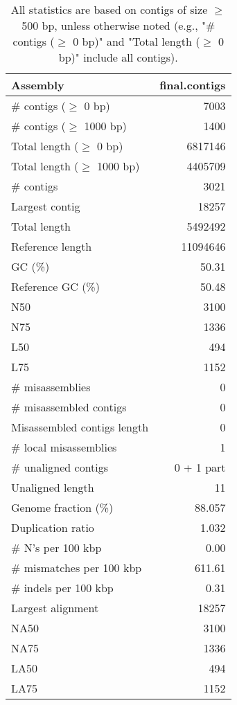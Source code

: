 \documentclass[12pt,a4paper]{article}
\begin{document}
\begin{table}[ht]
\begin{center}
\caption{All statistics are based on contigs of size $\geq$ 500 bp, unless otherwise noted (e.g., "\# contigs ($\geq$ 0 bp)" and "Total length ($\geq$ 0 bp)" include all contigs).}
\begin{tabular}{|l*{1}{|r}|}
\hline
Assembly & final.contigs \\ \hline
\# contigs ($\geq$ 0 bp) & 7003 \\ \hline
\# contigs ($\geq$ 1000 bp) & 1400 \\ \hline
Total length ($\geq$ 0 bp) & 6817146 \\ \hline
Total length ($\geq$ 1000 bp) & 4405709 \\ \hline
\# contigs & 3021 \\ \hline
Largest contig & 18257 \\ \hline
Total length & 5492492 \\ \hline
Reference length & 11094646 \\ \hline
GC (\%) & 50.31 \\ \hline
Reference GC (\%) & 50.48 \\ \hline
N50 & 3100 \\ \hline
N75 & 1336 \\ \hline
L50 & 494 \\ \hline
L75 & 1152 \\ \hline
\# misassemblies & 0 \\ \hline
\# misassembled contigs & 0 \\ \hline
Misassembled contigs length & 0 \\ \hline
\# local misassemblies & 1 \\ \hline
\# unaligned contigs & 0 + 1 part \\ \hline
Unaligned length & 11 \\ \hline
Genome fraction (\%) & 88.057 \\ \hline
Duplication ratio & 1.032 \\ \hline
\# N's per 100 kbp & 0.00 \\ \hline
\# mismatches per 100 kbp & 611.61 \\ \hline
\# indels per 100 kbp & 0.31 \\ \hline
Largest alignment & 18257 \\ \hline
NA50 & 3100 \\ \hline
NA75 & 1336 \\ \hline
LA50 & 494 \\ \hline
LA75 & 1152 \\ \hline
\end{tabular}
\end{center}
\end{table}
\end{document}
